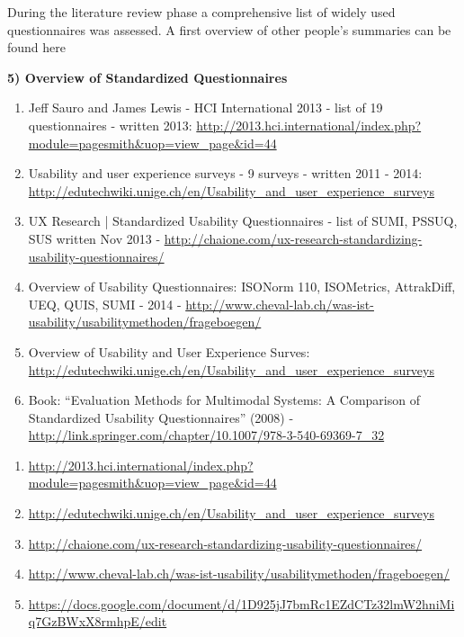 
		During the literature review phase a comprehensive list of widely used questionnaires was assessed. A first overview of other people's summaries can be found here






	\textbf{5) Overview of Standardized Questionnaires}

		\begin{enumerate}

		\item Jeff Sauro and James Lewis - HCI International 2013 - list of 19 questionnaires - written 2013: \url{http://2013.hci.international/index.php?module=pagesmith&uop=view_page&id=44}

		\item Usability and user experience surveys - 9 surveys	- written 2011 - 2014: \url{http://edutechwiki.unige.ch/en/Usability_and_user_experience_surveys}

		\item UX Research | Standardized Usability Questionnaires - list of SUMI, PSSUQ, SUS	written Nov 2013 - \url {http://chaione.com/ux-research-standardizing-usability-questionnaires/}
		\item Overview of Usability Questionnaires: ISONorm 110, ISOMetrics, AttrakDiff, UEQ, QUIS, SUMI - 2014 - \url{http://www.cheval-lab.ch/was-ist-usability/usabilitymethoden/frageboegen/}

		\item Overview of Usability and User Experience Surves: \url{http://edutechwiki.unige.ch/en/Usability_and_user_experience_surveys}

		\item Book: ``Evaluation Methods for Multimodal Systems: A Comparison of Standardized Usability Questionnaires'' (2008) - \url{http://link.springer.com/chapter/10.1007/978-3-540-69369-7_32}

		\end{enumerate}




		\begin{enumerate}
		\item \url{http://2013.hci.international/index.php?module=pagesmith&uop=view_page&id=44}
		\item \url{http://edutechwiki.unige.ch/en/Usability_and_user_experience_surveys}
		\item \url{http://chaione.com/ux-research-standardizing-usability-questionnaires/}
		\item \url{http://www.cheval-lab.ch/was-ist-usability/usabilitymethoden/frageboegen/}
		\item \url{https://docs.google.com/document/d/1D925jJ7bmRc1EZdCTz32lmW2hniMiq7GzBWxX8rmhpE/edit}
		\end{enumerate}


